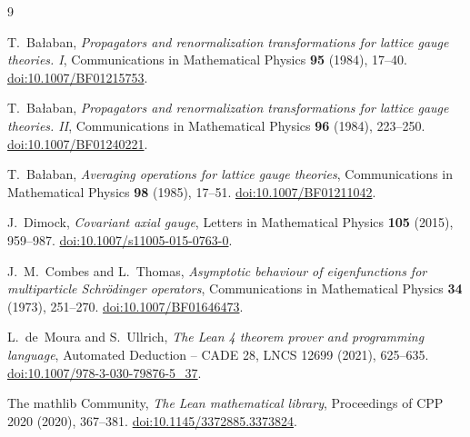 \documentclass[11pt]{article}
\theoremstyle{definition}
\begin{document}
\begin{thebibliography}{9}

T.~Ba\l aban,
\emph{Propagators and renormalization transformations for lattice gauge
theories. I},
Communications in Mathematical Physics \textbf{95} (1984), 17--40.
\href{https://doi.org/10.1007/BF01215753}{doi:10.1007/BF01215753}.

T.~Ba\l aban,
\emph{Propagators and renormalization transformations for lattice gauge
theories. II},
Communications in Mathematical Physics \textbf{96} (1984), 223--250.
\href{https://doi.org/10.1007/BF01240221}{doi:10.1007/BF01240221}.

T.~Ba\l aban,
\emph{Averaging operations for lattice gauge theories},
Communications in Mathematical Physics \textbf{98} (1985), 17--51.
\href{https://doi.org/10.1007/BF01211042}{doi:10.1007/BF01211042}.

J.~Dimock,
\emph{Covariant axial gauge},
Letters in Mathematical Physics \textbf{105} (2015), 959--987.
\href{https://doi.org/10.1007/s11005-015-0763-0}
{doi:10.1007/s11005-015-0763-0}.

J.~M.~Combes and L.~Thomas,
\emph{Asymptotic behaviour of eigenfunctions for multiparticle
Schr\"odinger operators},
Communications in Mathematical Physics \textbf{34} (1973), 251--270.
\href{https://doi.org/10.1007/BF01646473}{doi:10.1007/BF01646473}.

L.~de~Moura and S.~Ullrich,
\emph{The Lean 4 theorem prover and programming language},
Automated Deduction -- CADE 28, LNCS 12699 (2021), 625--635.
\href{https://doi.org/10.1007/978-3-030-79876-5_37}
{doi:10.1007/978-3-030-79876-5\_37}.

The mathlib Community,
\emph{The Lean mathematical library},
Proceedings of CPP 2020 (2020), 367--381.
\href{https://doi.org/10.1145/3372885.3373824}
{doi:10.1145/3372885.3373824}.

\end{thebibliography}
\end{document}
